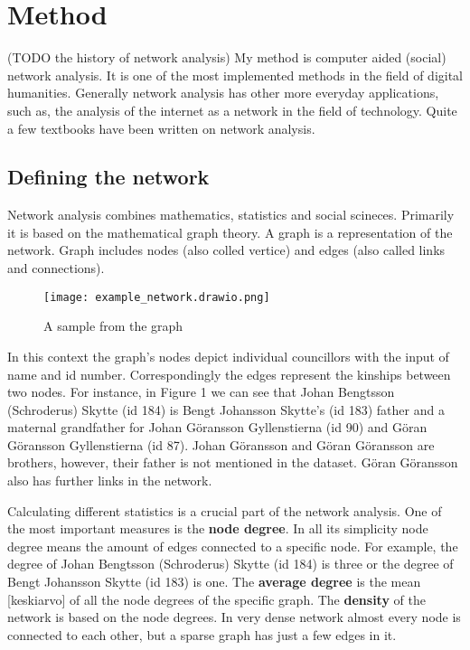 \section{Method}
\label{method}

(TODO the history of network analysis)
My method is computer aided (social) network analysis. It is one of the most implemented methods in the field of digital humanities. Generally network analysis has other more everyday applications, such as, the analysis of the internet as a network in the field of technology. Quite a few textbooks have been written on network analysis.


\subsection{Defining the network}
Network analysis combines mathematics, statistics and social scineces. Primarily it is based on the mathematical graph theory. A graph is a representation of the network. Graph includes nodes (also colled vertice) and edges (also called links and connections).

\begin{figure}[h]
	\texttt{[image: example\_network.drawio.png]}
	\centering
	\caption{A sample from the graph} 
	\centering
\end{figure}
In this context the graph's nodes depict individual councillors with the input of name and id number. Correspondingly the edges represent the kinships between two nodes. For instance, in Figure 1 we can see that Johan Bengtsson (Schroderus) Skytte (id 184) is Bengt Johansson Skytte's (id 183) father and a maternal grandfather for Johan Göransson Gyllenstierna (id 90) and Göran Göransson Gyllenstierna (id 87). Johan Göransson and Göran Göransson are brothers, however, their father is not mentioned in the dataset. Göran Göransson also has further links in the network. 

Calculating different statistics is a crucial part of the network analysis. One of the most important measures is the \textbf{node degree}. In all its simplicity node degree means the amount of edges connected to a specific node. For example, the degree of Johan Bengtsson (Schroderus) Skytte (id 184) is three or the degree of Bengt Johansson Skytte (id 183) is one. The \textbf{average degree} is the mean [keskiarvo] of all the node degrees of the specific graph. The \textbf{density} of the network is based on the node degrees. In very dense network almost every node is connected to each other, but a sparse graph has just a few edges in it.

